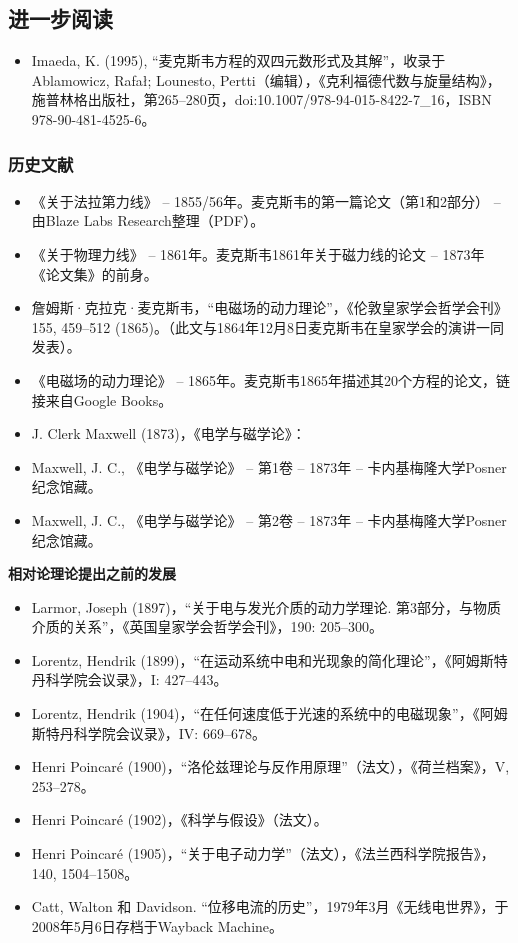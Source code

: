 \subsection{进一步阅读}
\begin{itemize}
\item Imaeda, K. (1995), “麦克斯韦方程的双四元数形式及其解”，收录于Ablamowicz, Rafał; Lounesto, Pertti（编辑），《克利福德代数与旋量结构》，施普林格出版社，第265–280页，doi:10.1007/978-94-015-8422-7_16，ISBN 978-90-481-4525-6。
\end{itemize}
\subsubsection{历史文献}

\begin{itemize}
\item 《关于法拉第力线》 – 1855/56年。麦克斯韦的第一篇论文（第1和2部分） – 由Blaze Labs Research整理（PDF）。
\item 《关于物理力线》 – 1861年。麦克斯韦1861年关于磁力线的论文 – 1873年《论文集》的前身。
\item  詹姆斯·克拉克·麦克斯韦，“电磁场的动力理论”，《伦敦皇家学会哲学会刊》155, 459–512 (1865)。（此文与1864年12月8日麦克斯韦在皇家学会的演讲一同发表）。
\item 《电磁场的动力理论》 – 1865年。麦克斯韦1865年描述其20个方程的论文，链接来自Google Books。
\item J. Clerk Maxwell (1873)，《电学与磁学论》：
\item Maxwell, J. C., 《电学与磁学论》 – 第1卷 – 1873年 – 卡内基梅隆大学Posner纪念馆藏。
\item Maxwell, J. C., 《电学与磁学论》 – 第2卷 – 1873年 – 卡内基梅隆大学Posner纪念馆藏。
\end{itemize}
\textbf{相对论理论提出之前的发展}

\begin{itemize}
\item Larmor, Joseph (1897)，“关于电与发光介质的动力学理论. 第3部分，与物质介质的关系”，《英国皇家学会哲学会刊》，190: 205–300。
\item Lorentz, Hendrik (1899)，“在运动系统中电和光现象的简化理论”，《阿姆斯特丹科学院会议录》，I: 427–443。
\item Lorentz, Hendrik (1904)，“在任何速度低于光速的系统中的电磁现象”，《阿姆斯特丹科学院会议录》，IV: 669–678。
\item Henri Poincaré (1900)，“洛伦兹理论与反作用原理”（法文），《荷兰档案》，V, 253–278。
\item Henri Poincaré (1902)，《科学与假设》（法文）。
\item Henri Poincaré (1905)，“关于电子动力学”（法文），《法兰西科学院报告》，140, 1504–1508。
\item Catt, Walton 和 Davidson. “位移电流的历史”，1979年3月《无线电世界》，于2008年5月6日存档于Wayback Machine。
\end{itemize}